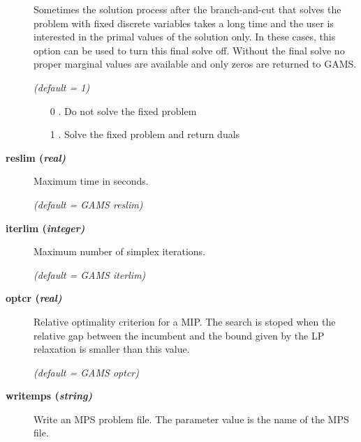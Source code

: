 \begin{description}
Sometimes the solution process after the branch-and-cut that solves the problem with fixed discrete variables takes a long time and the user is interested in the primal values of the solution only.
In these cases, this option can be used to turn this final solve off.
Without the final solve no proper marginal values are available and only zeros are returned to GAMS.

\textsl{(default = 1)}
\begin{itemize}
\item[0] .
Do not solve the fixed problem
\item[1] .
Solve the fixed problem and return duals
\end{itemize}

\item[\label{glpkreslim}\hypertarget{glpkreslim}
{\textbf{reslim (\slshape{real})}}]\hspace{1.0in}

Maximum time in seconds.

\textsl{(default = GAMS reslim)}

\item[\label{glpkiterlim}\hypertarget{glpkiterlim}
{\textbf{iterlim (\slshape{integer})}}]\hspace{1.0in}

Maximum number of simplex iterations.

\textsl{(default = GAMS iterlim)}

\item[\label{glpkoptcr}\hypertarget{glpkoptcr}
{\textbf{optcr (\slshape{real})}}]\hspace{1.0in}

Relative optimality criterion for a MIP.
The search is stoped when the relative gap between the incumbent and the bound given by the LP relaxation is smaller than this value.

\textsl{(default = GAMS optcr)}

\item[\label{glpkwritemps}\hypertarget{glpkwritemps}
{\textbf{writemps (\slshape{string})}}]\hspace{1.0in}

Write an MPS problem file.
The parameter value is the name of the MPS file.

\end{description}
